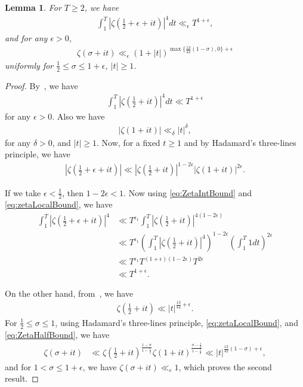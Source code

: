 \documentclass[10pt]{amsart}
\newtheorem{lemma}[theorem]{Lemma}
\begin{document}
\begin{lemma} \label{lem:zetabound}
For $T \geq 2$, we have
\begin{align} \label{eq:zeta12mom}
\int_{1}^{T}\left|\zeta\left(\frac{1}{2}+\epsilon+it\right)\right|^{4}dt\ll_\epsilon T^{1+\epsilon},
\end{align}
and for any $\epsilon > 0$,
\begin{align} \label{eq:zetabound}
\zeta(\sigma+it)\ll_{\epsilon}(1+|t|)^{\max\{\frac{13}{42}(1-\sigma),0\}+\epsilon}
\end{align}
uniformly for $\frac{1}{2}\leq\sigma\leq 1+\epsilon$, $|t|\geq 1$.
\end{lemma}
\begin{proof}

By~\cite[p.~148]{Titch}, we have \begin{align} \label{eq:ZetaIntBound}
\int_{1}^{T}\left|\zeta\left(\frac{1}{2}+it\right)\right|^{4}dt\ll T^{1+\epsilon}
\end{align} for any $\epsilon > 0$. Also we have \begin{align} \label{eq:zetaLocalBound}
    |\zeta(1+it)| \ll_{\delta} |t|^{\delta},
\end{align}
for any $\delta > 0 $, and $|t| \geq 1$. Now, for a fixed $t \geq 1$ and by Hadamard's three-lines principle, we have \begin{align}
    |\zeta(\frac{1}{2}+\epsilon+it)| \ll |\zeta(\frac{1}{2}+it)|^{1-2\epsilon} |\zeta(1+it)|^{2\epsilon}.
\end{align}

If we take $\epsilon < \frac{1}{2}$, then $1-2\epsilon < 1$. Now using \eqref{eq:ZetaIntBound} and \eqref{eq:zetaLocalBound}, we have \begin{align}
    \int_{1}^{T}  |\zeta(\frac{1}{2}+\epsilon+it)|^4 &\ll T^{\epsilon_1}\int_{1}^{T}|\zeta(\frac{1}{2}+it)|^{4(1-2\epsilon)} \\
    & \ll T^{\epsilon_1 } \left(\int_{1}^{T}|\zeta(\frac{1}{2}+it)|^{4} \right)^{1-2\epsilon} \left( \int_{1}^{T} 1 dt \right)^{2\epsilon} \\
    & \ll T^{\epsilon_1} T^{(1+\epsilon)(1-2\epsilon)}T^{2\epsilon} \\
    & \ll T^{1+\epsilon}.
\end{align}

On the other hand, from~\cite{BourJe}, we have \begin{align} \label{eq:ZetaHalfBound}
    \zeta\left( \frac{1}{2}+it \right) \ll |t|^{\frac{13}{84}+\epsilon}.
\end{align}
For $\frac{1}{2} \leq \sigma \leq 1$, using Hadamard's three-lines principle, \eqref{eq:zetaLocalBound}, and \eqref{eq:ZetaHalfBound}, we have \begin{align}
    \zeta\left( \sigma +it \right) &\ll \zeta\left( \frac{1}{2}+it \right)^{\frac{1-\sigma}{1-\frac{1}{2}}}\zeta\left( 1+it \right)^{\frac{\sigma -\frac{1}{2}}{1-\frac{1}{2}}} \ll |t|^{\frac{13}{42}(1-\sigma)+\epsilon},
\end{align}
and for $1 < \sigma \leq 1+\epsilon $, we have $\zeta\left( \sigma +it \right) \ll_\epsilon 1$, which proves the second result.
\end{proof}
\end{document}
